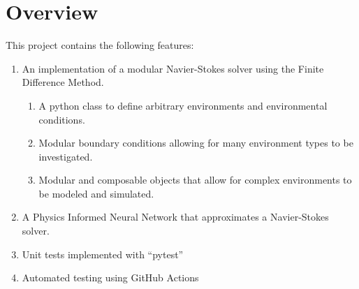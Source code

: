 \section{Overview}
This project contains the following features:

\begin{enumerate}
    \item An implementation of a modular Navier-Stokes solver using the Finite Difference Method.
        \begin{enumerate}
            \item A python class to define arbitrary environments and environmental conditions.
            \item Modular boundary conditions allowing for many environment types to be investigated.
            \item Modular and composable objects that allow for complex environments to be modeled and simulated.
        \end{enumerate}
    \item A Physics Informed Neural Network that approximates a Navier-Stokes solver.
    \item Unit tests implemented with ``pytest''
    \item Automated testing using GitHub Actions
\end{enumerate}